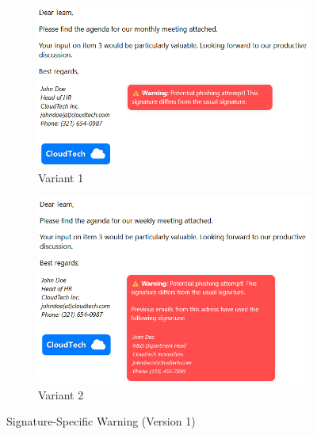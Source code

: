 \documentclass[
  a4paper,  %
  twoside,  %
  bibliography=totoc,
  headsepline,
  cleardoublepage=empty,
  parskip=half,
  draft=false
]{scrbook}
\begin{document}
\begin{figure} [H]
\centering
\begin{subfigure}{.5\textwidth}
  \centering
  \includegraphics[width=.8\linewidth]{figures/sig1_old.png}
  \caption{Variant 1}
\end{subfigure}%
\begin{subfigure}{.5\textwidth}
  \centering
  \includegraphics[width=.8\linewidth]{figures/sig2_old.png}
  \caption{Variant 2}
\end{subfigure}
\caption{Signature-Specific Warning (Version 1)}
\end{figure}
\end{document}
